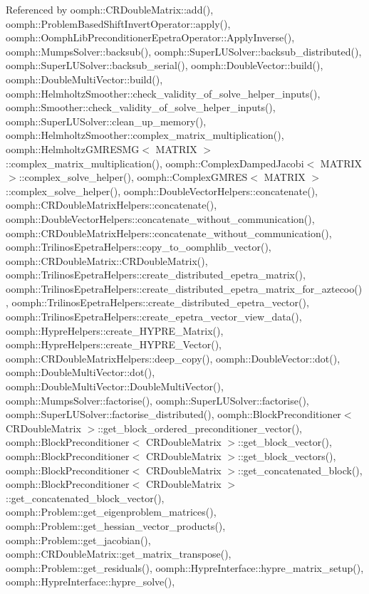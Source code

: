 Referenced by oomph\+::\+C\+R\+Double\+Matrix\+::add(), oomph\+::\+Problem\+Based\+Shift\+Invert\+Operator\+::apply(), oomph\+::\+Oomph\+Lib\+Preconditioner\+Epetra\+Operator\+::\+Apply\+Inverse(), oomph\+::\+Mumps\+Solver\+::backsub(), oomph\+::\+Super\+L\+U\+Solver\+::backsub\+\_\+distributed(), oomph\+::\+Super\+L\+U\+Solver\+::backsub\+\_\+serial(), oomph\+::\+Double\+Vector\+::build(), oomph\+::\+Double\+Multi\+Vector\+::build(), oomph\+::\+Helmholtz\+Smoother\+::check\+\_\+validity\+\_\+of\+\_\+solve\+\_\+helper\+\_\+inputs(), oomph\+::\+Smoother\+::check\+\_\+validity\+\_\+of\+\_\+solve\+\_\+helper\+\_\+inputs(), oomph\+::\+Super\+L\+U\+Solver\+::clean\+\_\+up\+\_\+memory(), oomph\+::\+Helmholtz\+Smoother\+::complex\+\_\+matrix\+\_\+multiplication(), oomph\+::\+Helmholtz\+G\+M\+R\+E\+S\+M\+G$<$ M\+A\+T\+R\+I\+X $>$\+::complex\+\_\+matrix\+\_\+multiplication(), oomph\+::\+Complex\+Damped\+Jacobi$<$ M\+A\+T\+R\+I\+X $>$\+::complex\+\_\+solve\+\_\+helper(), oomph\+::\+Complex\+G\+M\+R\+E\+S$<$ M\+A\+T\+R\+I\+X $>$\+::complex\+\_\+solve\+\_\+helper(), oomph\+::\+Double\+Vector\+Helpers\+::concatenate(), oomph\+::\+C\+R\+Double\+Matrix\+Helpers\+::concatenate(), oomph\+::\+Double\+Vector\+Helpers\+::concatenate\+\_\+without\+\_\+communication(), oomph\+::\+C\+R\+Double\+Matrix\+Helpers\+::concatenate\+\_\+without\+\_\+communication(), oomph\+::\+Trilinos\+Epetra\+Helpers\+::copy\+\_\+to\+\_\+oomphlib\+\_\+vector(), oomph\+::\+C\+R\+Double\+Matrix\+::\+C\+R\+Double\+Matrix(), oomph\+::\+Trilinos\+Epetra\+Helpers\+::create\+\_\+distributed\+\_\+epetra\+\_\+matrix(), oomph\+::\+Trilinos\+Epetra\+Helpers\+::create\+\_\+distributed\+\_\+epetra\+\_\+matrix\+\_\+for\+\_\+aztecoo(), oomph\+::\+Trilinos\+Epetra\+Helpers\+::create\+\_\+distributed\+\_\+epetra\+\_\+vector(), oomph\+::\+Trilinos\+Epetra\+Helpers\+::create\+\_\+epetra\+\_\+vector\+\_\+view\+\_\+data(), oomph\+::\+Hypre\+Helpers\+::create\+\_\+\+H\+Y\+P\+R\+E\+\_\+\+Matrix(), oomph\+::\+Hypre\+Helpers\+::create\+\_\+\+H\+Y\+P\+R\+E\+\_\+\+Vector(), oomph\+::\+C\+R\+Double\+Matrix\+Helpers\+::deep\+\_\+copy(), oomph\+::\+Double\+Vector\+::dot(), oomph\+::\+Double\+Multi\+Vector\+::dot(), oomph\+::\+Double\+Multi\+Vector\+::\+Double\+Multi\+Vector(), oomph\+::\+Mumps\+Solver\+::factorise(), oomph\+::\+Super\+L\+U\+Solver\+::factorise(), oomph\+::\+Super\+L\+U\+Solver\+::factorise\+\_\+distributed(), oomph\+::\+Block\+Preconditioner$<$ C\+R\+Double\+Matrix $>$\+::get\+\_\+block\+\_\+ordered\+\_\+preconditioner\+\_\+vector(), oomph\+::\+Block\+Preconditioner$<$ C\+R\+Double\+Matrix $>$\+::get\+\_\+block\+\_\+vector(), oomph\+::\+Block\+Preconditioner$<$ C\+R\+Double\+Matrix $>$\+::get\+\_\+block\+\_\+vectors(), oomph\+::\+Block\+Preconditioner$<$ C\+R\+Double\+Matrix $>$\+::get\+\_\+concatenated\+\_\+block(), oomph\+::\+Block\+Preconditioner$<$ C\+R\+Double\+Matrix $>$\+::get\+\_\+concatenated\+\_\+block\+\_\+vector(), oomph\+::\+Problem\+::get\+\_\+eigenproblem\+\_\+matrices(), oomph\+::\+Problem\+::get\+\_\+hessian\+\_\+vector\+\_\+products(), oomph\+::\+Problem\+::get\+\_\+jacobian(), oomph\+::\+C\+R\+Double\+Matrix\+::get\+\_\+matrix\+\_\+transpose(), oomph\+::\+Problem\+::get\+\_\+residuals(), oomph\+::\+Hypre\+Interface\+::hypre\+\_\+matrix\+\_\+setup(), oomph\+::\+Hypre\+Interface\+::hypre\+\_\+solve(), 